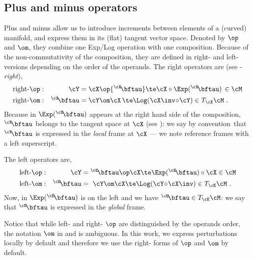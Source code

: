 \subsection{Plus and minus operators}

Plus and minus allow us to introduce increments between elements of a (curved) manifold, and express them in its (flat) tangent vector space. 
Denoted by $\op$ and $\om$, they combine one Exp/Log operation with one composition.
Because of the non-commutativity of the composition, they are defined in right- and left- versions depending on the order of the operands.
The right operators are (see -\emph{right}), 
%
\begin{align}
\textrm{right-}\op:&& \cY &= \cX\op{^\cX\!\bftau} \te \cX\circ\Exp({^\cX\!\bftau}) \,\in \cM \label{equ:rplus} \\
\textrm{right-}\om:&& {^\cX\!\bftau} &= \cY\om\cX \,\te \Log(\cX\inv\!\circ\!\cY)\in\mtanat{\cM}{\cX} \label{equ:rminus}
~.
\end{align}
%
Because in  $\Exp({^\cX\!\bftau})$ appears at the right hand side of the composition, 
${^\cX\!\bftau}$ belongs to the tangent space at $\cX$ (see ): 
we say by convention\footnotemark~that ${^\cX\!\bftau}$ is expressed in the \emph{local} frame at $\cX$ --- we note reference frames with a left superscript.

The left operators are,
\begin{align}
\textrm{left-}\op:&&\cY&={^\cE\!\bftau}\op\cX \te \Exp({^\cE\!\bftau})\circ\cX \in \cM \label{equ:lplus} \\
\textrm{left-}\om:&&{^\cE\!\bftau}&=~\cY\om\cX \te \Log(\cY\!\circ\!\cX\inv)\in\mtanat{\cM}{\cE}
\label{equ:lminus}
~.
\end{align}
%
Now, in  $\Exp({^\cE\!\bftau})$ is on the left and 
we have ${{^\cE\!\bftau}\in\mtanat{\cM}{\cE}}$: we say that ${{^\cE}\!\bftau}$ is expressed in the \emph{global} frame.

Notice that while left- and right- $\op$ are distinguished by the operands order, the notation $\om$ in  and  is ambiguous.
In this work, we express perturbations locally by default and therefore we use the right- forms of $\op$ and $\om$ by default.


